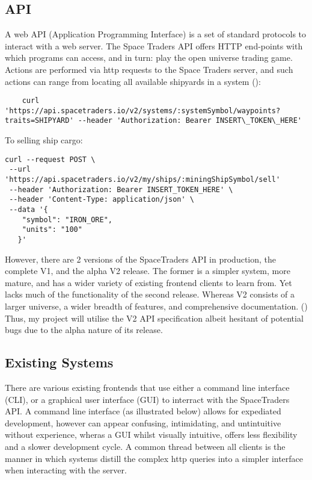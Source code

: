 \subsection{API}
A web API (Application Programming Interface) is a set of standard protocols to interact with a web server. The Space Traders API offers HTTP end-points with which programs can access, and in turn: play the open universe trading game. Actions are performed via http requests to the Space Traders server, and such actions can range from locating all available shipyards in a system (\textcite{spacetraders}):
\begin{lstlisting}
    curl 'https://api.spacetraders.io/v2/systems/:systemSymbol/waypoints?traits=SHIPYARD' --header 'Authorization: Bearer INSERT\_TOKEN\_HERE'

\end{lstlisting}
To selling ship cargo:

\begin{lstlisting}
curl --request POST \
 --url 'https://api.spacetraders.io/v2/my/ships/:miningShipSymbol/sell'
 --header 'Authorization: Bearer INSERT_TOKEN_HERE' \
 --header 'Content-Type: application/json' \
 --data '{
    "symbol": "IRON_ORE",
    "units": "100"
   }'
\end{lstlisting}

However, there are 2 versions of the SpaceTraders API in production, the complete V1, and the alpha V2 release. The former is a simpler system, more mature, and has a wider variety of existing frontend clients to learn from. Yet lacks much of the functionality of the second release.  Whereas V2 consists of a larger universe, a wider breadth of features, and comprehensive documentation. (\textcite{spacetraders}) Thus, my project will utilise the V2 API specification albeit hesitant of potential bugs due to the alpha nature of its release. 

\subsection{Existing Systems}
There are various existing frontends that use either a command line interface (CLI), or a graphical user interface (GUI) to interract with the SpaceTraders API. A command line interface (as illustrated below) allows for expediated development, however can appear confusing, intimidating, and untintuitive without experience, wheras a GUI whilst visually intuitive, offers less flexibility and a slower development cycle. A common thread between all clients is the manner in which systems distill the complex http queries into a simpler interface when interacting with the server.
\bigskip

